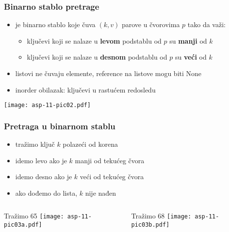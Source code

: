\documentclass[compress,aspectratio=169]{beamer}
\begin{document}
\begin{frame}[fragile]
  \frametitle{Binarno stablo pretrage}
  \begin{itemize}
    \item {} je binarno stablo koje čuva $(k, v)$ parove u čvorovima $p$ tako da važi:
    \begin{itemize}
      \item ključevi koji se nalaze u \textbf{levom} podstablu od $p$ su \textbf{manji} od $k$
      \item ključevi koji se nalaze u \textbf{desnom} podstablu od $p$ su \textbf{veći} od $k$
    \end{itemize}
    \item listovi ne čuvaju elemente, reference na listove mogu biti None
    \item inorder obilazak: ključevi u rastućem redosledu 
  \end{itemize}
  \begin{center}
    \texttt{[image: asp-11-pic02.pdf]}
  \end{center}
\end{frame}

\begin{frame}[fragile]
  \frametitle{Pretraga u binarnom stablu}
  \begin{itemize}
    \item tražimo ključ $k$ polazeći od korena
    \item idemo levo ako je $k$ manji od tekućeg čvora
    \item idemo desno ako je $k$ veći od tekućeg čvora
    \item ako dođemo do lista, $k$ nije nađen
  \end{itemize}
  \begin{columns}
    \begin{column}[c]{6cm}
      \begin{center}
        Tražimo 65
        \texttt{[image: asp-11-pic03a.pdf]}
      \end{center}
    \end{column}  
    \begin{column}[c]{6cm}
      \begin{center}
        Tražimo 68
        \texttt{[image: asp-11-pic03b.pdf]}
      \end{center}
    \end{column}  
  \end{columns}
\end{frame}
\end{document}
